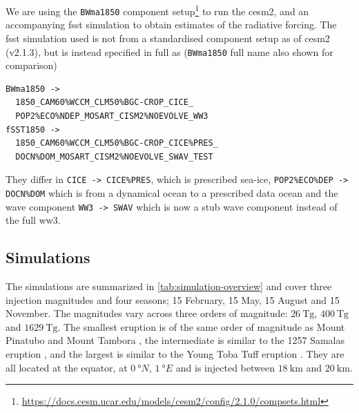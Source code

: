 \documentclass[twocol]{ametsocV5}
\begin{document}
We are using the \texttt{BWma1850} component
setup\footnote{\url{https://docs.cesm.ucar.edu/models/cesm2/config/2.1.0/compsets.html}}
to run the \acrshort{cesm2}, and an accompanying \acrfull{fsst} simulation to obtain
estimates of the radiative forcing. The \acrshort{fsst} simulation used is not from a
standardised component setup as of \acrshort{cesm2} (v2.1.3), but is instead specified
in full as (\texttt{BWma1850} full name also shown for comparison)
\begin{small}
  \begin{verbatim}
BWma1850 ->
  1850_CAM60%WCCM_CLM50%BGC-CROP_CICE_
  POP2%ECO%NDEP_MOSART_CISM2%NOEVOLVE_WW3
fSST1850 ->
  1850_CAM60%WCCM_CLM50%BGC-CROP_CICE%PRES_
  DOCN%DOM_MOSART_CISM2%NOEVOLVE_SWAV_TEST
  \end{verbatim}
\end{small}
They differ in \texttt{CICE -> CICE\%PRES}, which is prescribed sea-ice,
\texttt{POP2\%ECO\%DEP -> DOCN\%DOM} which is from a dynamical ocean to a prescribed
data ocean and the wave component \texttt{WW3 -> SWAV} which is now a stub wave
component instead of the full \acrfull{ww3}.

\subsection{Simulations}

The simulations are summarized in \cref{tab:simulation-overview} and cover three
 injection magnitudes and four seasons; 15 February, 15 May, 15 August and 15
November. The magnitudes vary across three orders of magnitude: \(\SI{26}{\tera\gram}\),
\(\SI{400}{\tera\gram}\) and \(\SI{1629}{\tera\gram}\). The smallest eruption is of the
same order of magnitude as Mount Pinatubo
\citep[\(\sim10\)--\(\SI{20}{\tera\gram}\);~e.g.][]{timmreck2018} and Mount Tambora
\citep[\(\sim\SI{56.2}{\tera\gram}\);~e.g.][]{zanchettin2016}, the intermediate is
similar to the 1257 Samalas eruption \citep[\(\sim
  119\)--\(\SI{250}{\tera\gram}\);~e.g.][]{toohey2017,ottobliesner2016}, and the largest
is similar to the Young Toba Tuff eruption
\citep[\(10\)--\(\SI{10000}{\tera\gram}\);][and~references~therein]{jones2005}. They are
all located at the equator, at \(\SI{0}{\degree N}\), \(\SI{1}{\degree E}\) and 
is injected between \(\SI{18}{\kilo\meter}\) and \(\SI{20}{\kilo\meter}\).
\end{document}
